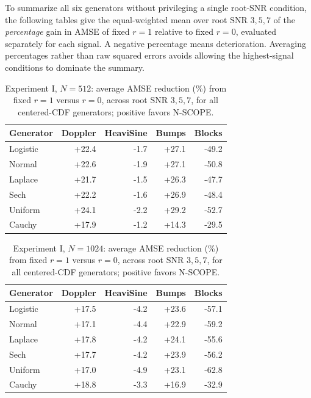 \documentclass[11pt]{article}
\numberwithin{equation}{section}
\begin{document}
To summarize all six generators without privileging a single root-SNR
condition, the following tables give the equal-weighted mean over
root SNR $3,5,7$ of the \emph{percentage} gain in AMSE of fixed
$r=1$ relative to fixed $r=0$, evaluated separately for each signal.
A negative percentage means deterioration. Averaging percentages
rather than raw squared errors avoids allowing the highest-signal
conditions to dominate the summary.

\begin{table}[H]
\centering\small
\caption{Experiment I, $N=512$: average AMSE reduction (\%) from fixed $r=1$ versus $r=0$, across root SNR $3,5,7$, for all centered-CDF generators; positive favors N-SCOPE.}
\label{tab:s5-gain-512}
\setlength{\tabcolsep}{5pt}
\begin{tabular}{lrrrr}
\toprule
Generator & Doppler & HeaviSine & Bumps & Blocks \\
\midrule
Logistic & +22.4 & -1.7 & +27.1 & -49.2 \\
Normal & +22.6 & -1.9 & +27.1 & -50.8 \\
Laplace & +21.7 & -1.5 & +26.3 & -47.7 \\
Sech & +22.2 & -1.6 & +26.9 & -48.4 \\
Uniform & +24.1 & -2.2 & +29.2 & -52.7 \\
Cauchy & +17.9 & -1.2 & +14.3 & -29.5 \\
\bottomrule
\end{tabular}
\end{table}

\begin{table}[H]
\centering\small
\caption{Experiment I, $N=1024$: average AMSE reduction (\%) from fixed $r=1$ versus $r=0$, across root SNR $3,5,7$, for all centered-CDF generators; positive favors N-SCOPE.}
\label{tab:s5-gain-1024}
\setlength{\tabcolsep}{5pt}
\begin{tabular}{lrrrr}
\toprule
Generator & Doppler & HeaviSine & Bumps & Blocks \\
\midrule
Logistic & +17.5 & -4.2 & +23.6 & -57.1 \\
Normal & +17.1 & -4.4 & +22.9 & -59.2 \\
Laplace & +17.8 & -4.2 & +24.1 & -55.6 \\
Sech & +17.7 & -4.2 & +23.9 & -56.2 \\
Uniform & +17.0 & -4.9 & +23.1 & -62.8 \\
Cauchy & +18.8 & -3.3 & +16.9 & -32.9 \\
\bottomrule
\end{tabular}
\end{table}
\end{document}
